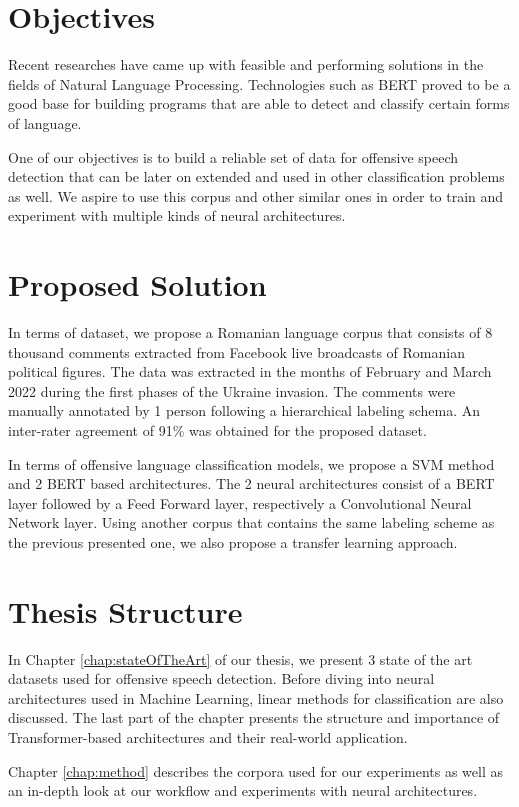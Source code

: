 \documentclass[12pt,a4paper]{report}
\begin{document}
\section{Objectives}
Recent researches have came up with feasible and performing solutions in the fields of Natural Language Processing. Technologies such as BERT\citep{devlin2019bert} proved to be a good base for building programs that are able to detect and classify certain forms of language.

One of our objectives is to build a reliable set of data for offensive speech detection that can be later on extended and used in other classification problems as well. We aspire to use this corpus and other similar ones in order to train and experiment with multiple kinds of neural architectures.

\section{Proposed Solution}
\label{sec:proposedSolution}
In terms of dataset, we propose a Romanian language corpus that consists of 8 thousand comments extracted from Facebook live broadcasts of Romanian political figures. The data was extracted in the months of February and March 2022 during the first phases of the Ukraine invasion. The comments were manually annotated by 1 person following a hierarchical labeling schema. An inter-rater agreement of 91\% was obtained for the proposed dataset.

In terms of offensive language classification models, we propose a SVM method and 2 BERT based architectures. The 2 neural architectures consist of a BERT layer followed by a Feed Forward layer, respectively a Convolutional Neural Network layer. Using another corpus that contains the same labeling scheme as the previous presented one, we also propose a transfer learning approach.


\section{Thesis Structure}
In Chapter \ref{chap:stateOfTheArt} of our thesis, we present 3 state of the art datasets used for offensive speech detection. Before diving into neural architectures used in Machine Learning, linear methods for classification are also discussed. The last part of the chapter presents the structure and importance of Transformer-based architectures and their real-world application.

Chapter \ref{chap:method} describes the corpora used for our experiments as well as an in-depth look at our workflow and experiments with neural architectures.
\end{document}
